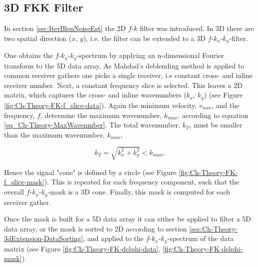 \subsection{3D FKK Filter} \label{sec:Ch-Theory-3dExtension-FKK}

In section \ref{sec:IterBlenNoiseEst} the 2D $f$-$k$ filter was introduced. In 3D there are two spatial direction ($x$, $y$), i.e. the filter can be extended to a 3D $f$-$k_x$-$k_y$-filter.

One obtains the $f$-$k_x$-$k_y$-spectrum by applying an n-dimensional Fourier transform to the 5D data array. As Mahdad's deblending method is applied to common receiver gathers one picks a single receiver, i.e constant cross- and inline receiver number. Next, a constant frequency slice is selected. This leaves a 2D matrix, which captures the cross- and inline wavenumbers ($k_x$, $k_y$) (see Figure \ref{fig:Ch-Theory-FK-f_slice-data}). Again the minimum velocity, $v_{min}$, and the frequency, $f$, determine the maximum wavenumber, $k_{max}$, according to equation \ref{eq_Ch-Theory-MaxWavenmber}. The total wavenumber, $k_{T}$, must be smaller than the maximum wavenumber, $k_{max}$,

\begin{equation}
	k_{T} = \sqrt{k_x^2 + k_{y}^2} < k_{max}.
	\label{eq:Ch-Theory-TotalWavenumber}
\end{equation}

Hence the signal "cone" is defined by a circle (see Figure \ref{fig:Ch-Theory-FK-f_slice-mask}). This is repeated for each frequency component, such that the overall $f$-$k_x$-$k_y$-mask is a 3D cone. Finally, this mask is computed for each receiver gather.

Once the mask is built for a 5D data array it can either be applied to filter a 5D data array, or the mask is sorted to 2D according to section \ref{sec:Ch-Theory-3dExtension-DataSorting}, and applied to the $f$-$k_x$-$k_y$-spectrum of the data matrix (see Figure \ref{fig:Ch-Theory-FK-delphi-data}, \ref{fig:Ch-Theory-FK-delphi-mask}).

